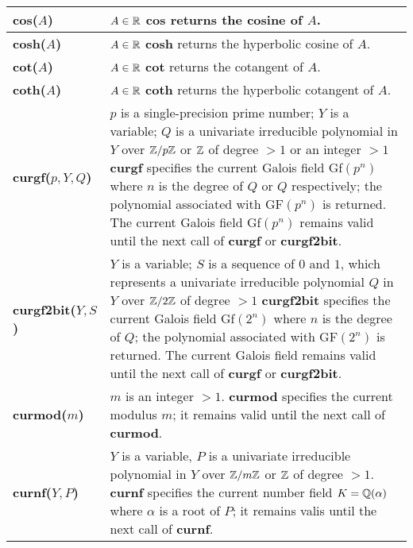 {\newpage

\begin{tabular}{|p{1.95in}|p{3.83in}|} \hline

{\bf cos($A$)} &
$A \in \mbox{$\mathbb R$}$\newline
{\bf cos} returns the cosine of $A$. \\ \hline

{\bf cosh($A$)} &
$A \in \mbox{$\mathbb R$}$\newline
{\bf cosh} returns the hyperbolic cosine of $A$. \\ \hline

{\bf cot($A$)} &
$A \in \mbox{$\mathbb R$}$\newline
{\bf cot} returns the cotangent of $A$. \\ \hline

{\bf coth($A$)} &
$A \in \mbox{$\mathbb R$}$\newline
{\bf coth} returns the hyperbolic cotangent of $A$. \\ \hline

{\bf curgf($p, Y, Q$)} &
$p$ is a single-precision prime number; $Y$ is a variable; $Q$ is
a univariate irreducible polynomial in $Y$ over $\mbox{$\mathbb Z$}/p\mbox{$\mathbb Z$}$ or $\mbox{$\mathbb Z$}$
of degree $> 1$ or an integer $> 1$ \newline
{\bf curgf} specifies the current Galois field Gf$(p^n)$ where
$n$ is the degree of $Q$ or $Q$ respectively; the polynomial associated with
GF$(p^n)$ is returned. The current Galois field Gf$(p^n)$ remains valid until 
the next call of {\bf curgf} or {\bf curgf2bit}.\\ \hline

{\bf curgf2bit($Y, S$)} &
$Y$ is a variable; $S$ is a sequence of $0$ and $1$, which represents a
univariate irreducible polynomial $Q$ in $Y$ over $\mbox{$\mathbb Z$}/2\mbox{$\mathbb Z$}$ of degree 
$> 1$ \newline
{\bf curgf2bit} specifies the current Galois field Gf$(2^n)$ where
$n$ is the degree of $Q$; the polynomial associated with GF$(2^n)$ is returned. 
The current Galois field remains valid until the next
call of {\bf curgf} or {\bf curgf2bit}.\\ \hline

{\bf curmod($m$)} &
$m$ is an integer $> 1$.\newline
{\bf curmod} specifies the current modulus $m$; it remains valid
until the next call of {\bf curmod}.\\ \hline

{\bf curnf($Y,P$)} &
$Y$ is a variable, $P$ is a univariate irreducible polynomial in $Y$
over $\mbox{$\mathbb Z$}/m\mbox{$\mathbb Z$}$ or $\mbox{$\mathbb Z$}$ of degree $> 1$.\newline
{\bf curnf} specifies the current number field $K=\mbox{$\mathbb Q$}(\alpha )$ where
$\alpha $ is a root of $P$; it remains valis until the next call of
{\bf curnf}.\\ \hline


\end{tabular}}
